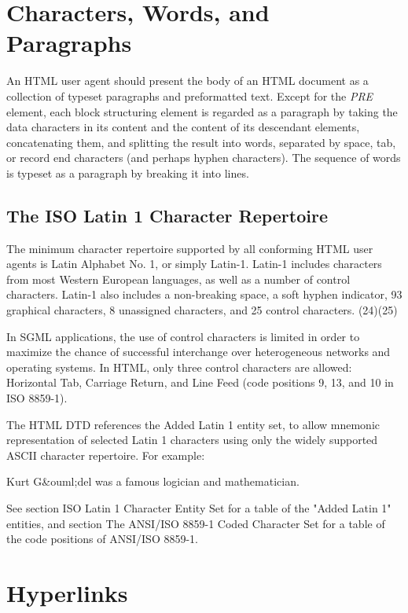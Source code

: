 \section*{Characters, Words, and Paragraphs}\par 
An HTML user agent should present the body of an HTML document as
a collection of typeset paragraphs and preformatted text.  Except
for the {\it PRE} element, each block structuring element is regarded as
a paragraph by taking the data characters in its content and the
content of its descendant elements, concatenating them, and
splitting the result into words, separated by space, tab, or
record end characters (and perhaps hyphen characters).  The
sequence of words is typeset as a paragraph by breaking it into
lines.
\par \subsection*{The ISO Latin 1 Character Repertoire}\par 
The minimum character repertoire supported by all conforming HTML user
agents is Latin Alphabet No.  1, or simply Latin-1.  Latin-1 includes
characters from most Western European languages, as well as a number
of control characters.  Latin-1 also includes a non-breaking space, a
soft hyphen indicator, 93 graphical characters, 8 unassigned
characters, and 25 control characters.
(24)(25)\par \par 
In SGML applications, the use of control characters is limited in
order to maximize the chance of successful interchange over
heterogeneous networks and operating systems.  In HTML, only three
control characters are allowed:  Horizontal Tab, Carriage Return, and
Line Feed (code positions 9, 13, and 10 in ISO 8859-1).
\par \par 
The HTML DTD references the Added Latin 1 entity set, to allow
mnemonic representation of selected Latin 1 characters using only the
widely supported ASCII character repertoire.  For example:
\par Kurt G\&ouml;del was a famous logician and mathematician.
\par 
See section ISO Latin 1 Character Entity Set for a table of the "Added Latin 1" entities,
and section The ANSI/ISO 8859-1 Coded Character Set for a table of the code positions of
ANSI/ISO 8859-1.
\par \section*{Hyperlinks}\par 
